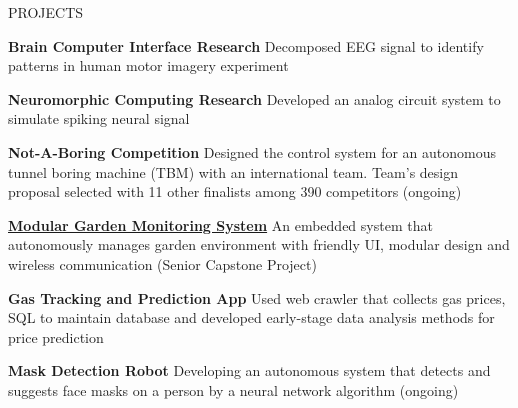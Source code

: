 \documentclass{../lib/resume} %
\begin{document}

\begin{rSection}{PROJECTS}
    \vspace{-1em}
    \item \textbf{Brain Computer Interface Research} {Decomposed EEG signal to identify patterns in human motor imagery experiment}

    \item \textbf{Neuromorphic Computing Research} {Developed an analog circuit system to simulate spiking neural signal}

    \item \textbf{Not-A-Boring Competition} {Designed the control system for an autonomous tunnel boring machine (TBM) with an international team. Team's design proposal selected with 11 other finalists among 390 competitors (ongoing)}

    \item \href{https://github.com/liu2z2/mgms}{\textbf{Modular Garden Monitoring System}} {An embedded system that autonomously manages garden environment with friendly UI, modular design and wireless communication (Senior Capstone Project)}

    \item \textbf{Gas Tracking and Prediction App} {Used web crawler that collects gas prices, SQL to maintain database and developed early-stage data analysis methods for price prediction}

    \item \textbf{Mask Detection Robot} {Developing an autonomous system that detects and suggests face masks on a person by a neural network algorithm (ongoing)}


\end{rSection}
\end{document}
